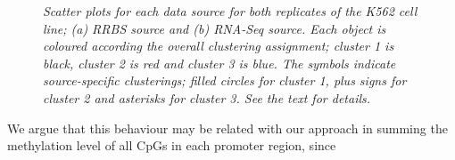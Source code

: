 \begin{figure}[ht!]
     \begin{center}
    \end{center}
    \caption{\emph{Scatter plots for each data source for both replicates of the K562 cell line; (a) RRBS source and (b) RNA-Seq source.  Each object is coloured according the overall clustering assignment; cluster 1 is black, cluster 2 is red and cluster 3 is blue. The symbols indicate source-specific clusterings; filled circles for cluster 1, plus signs for cluster 2 and asterisks for cluster 3. See the text for details.}}
   \label{bcck562-pic}
\end{figure}


 We argue that this behaviour may be related with our approach in summing the methylation level of all CpGs in each promoter region, since 


